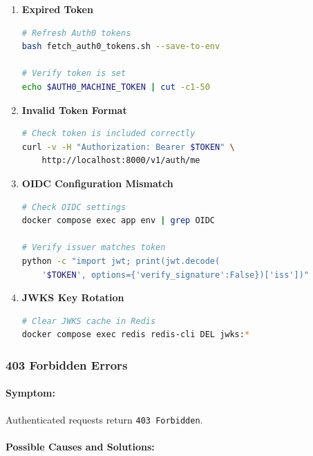 \begin{enumerate}
    \item \textbf{Expired Token}
    \begin{lstlisting}[language=bash, caption=Refresh authentication tokens]
# Refresh Auth0 tokens
bash fetch_auth0_tokens.sh --save-to-env

# Verify token is set
echo $AUTH0_MACHINE_TOKEN | cut -c1-50
    \end{lstlisting}
    
    \item \textbf{Invalid Token Format}
    \begin{lstlisting}[language=bash, caption=Verify token format]
# Check token is included correctly
curl -v -H "Authorization: Bearer $TOKEN" \
    http://localhost:8000/v1/auth/me
    \end{lstlisting}
    
    \item \textbf{OIDC Configuration Mismatch}
    \begin{lstlisting}[language=bash, caption=Verify OIDC configuration]
# Check OIDC settings
docker compose exec app env | grep OIDC

# Verify issuer matches token
python -c "import jwt; print(jwt.decode(
    '$TOKEN', options={'verify_signature':False})['iss'])"
    \end{lstlisting}
    
    \item \textbf{JWKS Key Rotation}
    \begin{lstlisting}[language=bash, caption=Clear JWKS cache]
# Clear JWKS cache in Redis
docker compose exec redis redis-cli DEL jwks:*
    \end{lstlisting}
\end{enumerate}

\subsubsection{403 Forbidden Errors}

\paragraph{Symptom:} Authenticated requests return \texttt{403 Forbidden}.

\paragraph{Possible Causes and Solutions:}

